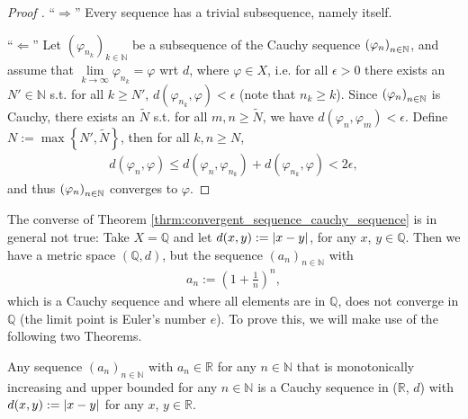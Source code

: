 \begin{proof}[Proof \cite{354965}]
	\enquote{$\Longrightarrow$} Every sequence has a trivial subsequence, namely itself.
	
	\enquote{$\Longleftarrow$} Let $\left(\varphi_{n_k}\right)_{k\in\mathbb N}$ be a subsequence of the Cauchy sequence $\seq[\varphi_n]$, and assume that $\lim\limits_{k\to\infty}\varphi_{n_k} = \varphi$ wrt $d$, where $\varphi\in X$, i.e. for all $\epsilon > 0$ there exists an $N'\in\mathbb N$ s.t. for all $k\geq N'$, $d(\varphi_{n_k}, \varphi) < \epsilon$ (note that $n_k \geq k$). Since $\seq[\varphi_n]$ is Cauchy, there exists an $\tilde{N}$ s.t. for all $m, n\geq \tilde{N}$, we have $d(\varphi_n, \varphi_m) < \epsilon$. Define $N := \max\left\{N', \tilde{N}\right\}$, then for all $k, n\geq N$,
	\begin{align*}
		d(\varphi_n, \varphi) \leq d(\varphi_n, \varphi_{n_k}) + d(\varphi_{n_k}, \varphi) < 2\epsilon,
	\end{align*}
	and thus $\seq[\varphi_n]$ converges to $\varphi$.
\end{proof}

\begin{remark}\label{remark:cauchy_not_convergent_necess}
	The converse of Theorem \ref{thrm:convergent_sequence_cauchy_sequence} is in general not true: Take $X=\mathbb Q$ and let $d(x, y) := \abs{x - y}$, for any $x$, $y\in\mathbb Q$. Then we have a metric space $(\mathbb Q, d)$, but the sequence $(a_n)_{n\in\mathbb N}$ with
	\begin{align}\label{eq:seq_euler}
		a_n := \left(1 + \frac{1}{n}\right)^n,
	\end{align}
	which is a Cauchy sequence and where all elements are in $\mathbb Q$, does not converge in $\mathbb Q$ (the limit point is Euler's number $e$). To prove this, we will make use of the following two Theorems.
\end{remark}

\begin{theorem}\label{thrm:mono_inc_seq_Cauchy}
	Any sequence $(a_n)_{n\in\mathbb N}$ with $a_n\in \mathbb R$ for any $n\in \mathbb N$ that is monotonically increasing and upper bounded for any $n\in\mathbb N$ is a Cauchy sequence in ($\mathbb R$, $d$) with $d(x, y):= \abs{x - y}$ for any $x$, $y\in \mathbb R$.		
\end{theorem}


